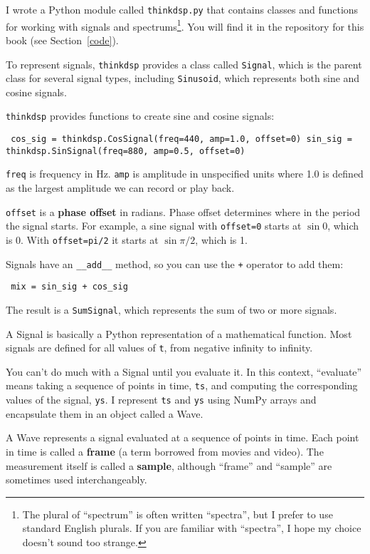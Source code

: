 \documentclass[12pt]{book} \usepackage[width=5.5in,height=8.5in, hmarginratio=3:2,vmarginratio=1:1]{geometry}
\begin{document}
I wrote a Python module called {\tt thinkdsp.py} that contains classes and functions for working with signals and spectrums\footnote{The plural of ``spectrum'' is often written ``spectra'', but I prefer to use standard English plurals. If you are familiar with ``spectra'', I hope my choice doesn't sound too strange.}. You will find it in the repository for this book (see Section~\ref{code}). 

To represent signals, {\tt thinkdsp} provides a class called {\tt Signal}, which is the parent class for several signal types, including {\tt Sinusoid}, which represents both sine and cosine signals. 

{\tt thinkdsp} provides functions to create sine and cosine signals: 

\begin{verbatim} cos_sig = thinkdsp.CosSignal(freq=440, amp=1.0, offset=0) sin_sig = thinkdsp.SinSignal(freq=880, amp=0.5, offset=0) \end{verbatim} 

{\tt freq} is frequency in Hz. {\tt amp} is amplitude in unspecified units where 1.0 is defined as the largest amplitude we can record or play back. 

{\tt offset} is a {\bf phase offset} in radians. Phase offset determines where in the period the signal starts. For example, a sine signal with {\tt offset=0} starts at $\sin 0$, which is 0. With {\tt offset=pi/2} it starts at $\sin \pi/2$, which is 1. 

Signals have an \verb"__add__" method, so you can use the {\tt +} operator to add them: 

\begin{verbatim} mix = sin_sig + cos_sig \end{verbatim} 

The result is a {\tt SumSignal}, which represents the sum of two or more signals. 

A Signal is basically a Python representation of a mathematical function. Most signals are defined for all values of {\tt t}, from negative infinity to infinity. 

You can't do much with a Signal until you evaluate it. In this context, ``evaluate'' means taking a sequence of points in time, {\tt ts}, and computing the corresponding values of the signal, {\tt ys}. I represent {\tt ts} and {\tt ys} using NumPy arrays and encapsulate them in an object called a Wave. 

A Wave represents a signal evaluated at a sequence of points in time. Each point in time is called a {\bf frame} (a term borrowed from movies and video). The measurement itself is called a {\bf sample}, although ``frame'' and ``sample'' are sometimes used interchangeably. 
\end{document}

